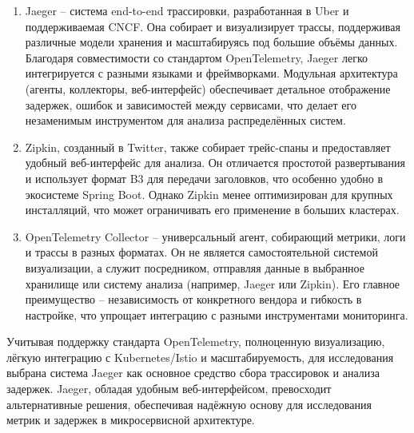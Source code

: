     \begin{enumerate}
    \item Jaeger – система end-to-end трассировки, разработанная в Uber и поддерживаемая CNCF. Она собирает и визуализирует трассы, поддерживая различные модели хранения и масштабируясь под большие объёмы данных. Благодаря совместимости со стандартом OpenTelemetry, Jaeger легко интегрируется с разными языками и фреймворками. Модульная архитектура (агенты, коллекторы, веб-интерфейс) обеспечивает детальное отображение задержек, ошибок и зависимостей между сервисами, что делает его незаменимым инструментом для анализа распределённых систем.
    
    \item Zipkin, созданный в Twitter, также собирает трейс-спаны и предоставляет удобный веб-интерфейс для анализа. Он отличается простотой развертывания и использует формат B3 для передачи заголовков, что особенно удобно в экосистеме Spring Boot. Однако Zipkin менее оптимизирован для крупных инсталляций, что может ограничивать его применение в больших кластерах.
    
    \item OpenTelemetry Collector – универсальный агент, собирающий метрики, логи и трассы в разных форматах. Он не является самостоятельной системой визуализации, а служит посредником, отправляя данные в выбранное хранилище или систему анализа (например, Jaeger или Zipkin). Его главное преимущество – независимость от конкретного вендора и гибкость в настройке, что упрощает интеграцию с разными инструментами мониторинга.
    \end{enumerate}

    Учитывая поддержку стандарта OpenTelemetry, полноценную визуализацию, лёгкую интеграцию с Kubernetes/Istio и масштабируемость, для исследования выбрана система Jaeger как основное средство сбора трассировок и анализа задержек. Jaeger, обладая удобным веб-интерфейсом, превосходит альтернативные решения, обеспечивая надёжную основу для исследования метрик  и задержек в микросервисной архитектуре.


